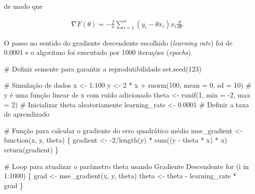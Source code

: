 \documentclass[
  a4paperpaper,
]{article}
\newenvironment{Shaded}{\begin{snugshade}}{\end{snugshade}}
\newcommand{\AttributeTok}[1]{\textcolor[rgb]{0.40,0.45,0.13}{#1}}
\newcommand{\CommentTok}[1]{\textcolor[rgb]{0.37,0.37,0.37}{#1}}
\newcommand{\ControlFlowTok}[1]{\textcolor[rgb]{0.00,0.23,0.31}{#1}}
\newcommand{\DecValTok}[1]{\textcolor[rgb]{0.68,0.00,0.00}{#1}}
\newcommand{\FloatTok}[1]{\textcolor[rgb]{0.68,0.00,0.00}{#1}}
\newcommand{\FunctionTok}[1]{\textcolor[rgb]{0.28,0.35,0.67}{#1}}
\newcommand{\NormalTok}[1]{\textcolor[rgb]{0.00,0.23,0.31}{#1}}
\newcommand{\OtherTok}[1]{\textcolor[rgb]{0.00,0.23,0.31}{#1}}
\newcommand{\SpecialCharTok}[1]{\textcolor[rgb]{0.37,0.37,0.37}{#1}}
\begin{document}
\noindent de modo que

\begin{align}
  \nabla F(\theta) = -\frac{2}{n} \sum\limits_{i=1}^{n} (y_i - \theta x_i) x_i \frac{d}{d \theta}.
\end{align}

O passo no sentido do gradiente descendente escolhido (\emph{learning
rate}) foi de 0.0001 e o algoritmo foi executado por 1000 iterações
(\emph{epochs}).

\begin{Shaded}
\begin{Highlighting}[]
\CommentTok{\# Definir semente para garantir a reprodutibilidade}
\FunctionTok{set.seed}\NormalTok{(}\DecValTok{123}\NormalTok{)}

\CommentTok{\# Simulação de dados}
\NormalTok{x }\OtherTok{\textless{}{-}} \DecValTok{1}\SpecialCharTok{:}\DecValTok{100}
\NormalTok{y }\OtherTok{\textless{}{-}} \DecValTok{2} \SpecialCharTok{*}\NormalTok{ x }\SpecialCharTok{+} \FunctionTok{rnorm}\NormalTok{(}\DecValTok{100}\NormalTok{, }\AttributeTok{mean =} \DecValTok{0}\NormalTok{, }\AttributeTok{sd =} \DecValTok{10}\NormalTok{)  }\CommentTok{\# y é uma função linear de x com ruído adicionado}
\NormalTok{theta }\OtherTok{\textless{}{-}} \FunctionTok{runif}\NormalTok{(}\DecValTok{1}\NormalTok{, }\AttributeTok{min =} \SpecialCharTok{{-}}\DecValTok{2}\NormalTok{, }\AttributeTok{max =} \DecValTok{2}\NormalTok{)  }\CommentTok{\# Inicializar theta aleatoriamente}
\NormalTok{learning\_rate }\OtherTok{\textless{}{-}} \FloatTok{0.0001}  \CommentTok{\# Definir a taxa de aprendizado}

\CommentTok{\# Função para calcular o gradiente do erro quadrático médio}
\NormalTok{mse\_gradient }\OtherTok{\textless{}{-}} \ControlFlowTok{function}\NormalTok{(x, y, theta) \{}
\NormalTok{  gradient }\OtherTok{\textless{}{-}} \SpecialCharTok{{-}}\DecValTok{2}\SpecialCharTok{/}\FunctionTok{length}\NormalTok{(y) }\SpecialCharTok{*} \FunctionTok{sum}\NormalTok{((y }\SpecialCharTok{{-}}\NormalTok{ theta }\SpecialCharTok{*}\NormalTok{ x) }\SpecialCharTok{*}\NormalTok{ x)}
  \FunctionTok{return}\NormalTok{(gradient)}
\NormalTok{\}}

\CommentTok{\# Loop para atualizar o parâmetro theta usando Gradiente Descendente}
\ControlFlowTok{for}\NormalTok{ (i }\ControlFlowTok{in} \DecValTok{1}\SpecialCharTok{:}\DecValTok{1000}\NormalTok{) \{}
\NormalTok{  grad }\OtherTok{\textless{}{-}} \FunctionTok{mse\_gradient}\NormalTok{(x, y, theta)}
\NormalTok{  theta }\OtherTok{\textless{}{-}}\NormalTok{ theta }\SpecialCharTok{{-}}\NormalTok{ learning\_rate }\SpecialCharTok{*}\NormalTok{ grad}
\NormalTok{\}}
\end{Highlighting}
\end{Shaded}
\end{document}
